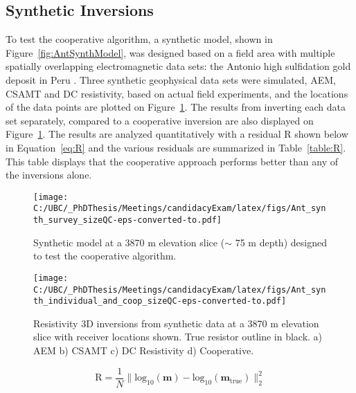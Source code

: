 \documentclass[letterpaper,11pt]{article}
\begin{document}
\subsection{Synthetic Inversions}
To test the cooperative algorithm, a synthetic model, shown in Figure~\ref{fig:AntSynthModel}, was designed based on a field area with multiple spatially overlapping electromagnetic data sets: the Antonio high sulfidation gold deposit in Peru \cite[]{Teal2010}.  Three synthetic geophysical data sets were simulated, AEM, CSAMT and DC resistivity, based on actual field experiments, and the locations of the data points are plotted on Figure~\ref{fig:CoopSynthInversions}. The results from inverting each data set separately, compared to a cooperative inversion are also displayed on Figure~\ref{fig:CoopSynthInversions}.  The results are analyzed quantitatively with a residual R shown below in Equation~\ref{eq:R} and the various residuals are summarized in Table~\ref{table:R}.  This table displays that the cooperative approach performs better than any of the inversions alone.

\begin{figure}[h]
\centering
\begin{minipage}{.45\textwidth}
  \centering
  \texttt{[image: C:/UBC/\_PhDThesis/Meetings/candidacyExam/latex/figs/Ant\_synth\_survey\_sizeQC-eps-converted-to.pdf]}
  \caption{Synthetic model at a 3870 m  \newline elevation slice ($ \sim $ 75 m depth) designed \newline to test the cooperative algorithm.}
  \label{fig:AntSynthModel}
\end{minipage}%
  \begin{minipage}{.45\textwidth}
  \texttt{[image: C:/UBC/\_PhDThesis/Meetings/candidacyExam/latex/figs/Ant\_synth\_individual\_and\_coop\_sizeQC-eps-converted-to.pdf]}
  \caption{Resistivity 3D inversions from synthetic data at a 3870 m elevation slice with receiver locations shown. True resistor outline in black. a) AEM b) CSAMT c) DC Resistivity d) Cooperative.}
  \label{fig:CoopSynthInversions}
    \end{minipage}
\end{figure}

\begin{equation}
\mathrm{R} =  \frac{1}{N}\|\mathrm{log}_{10}(\mathbf{m}) - \mathrm{log}_{10}(\mathbf{m_{\mathrm{true}}}) \|^{2}_{2}
\label{eq:R}
\end{equation}
\end{document}
